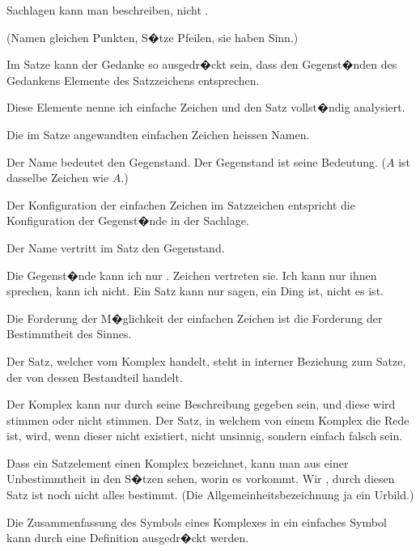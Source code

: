 \begin{propositions}
{Sachlagen kann man beschreiben, nicht .

(Namen gleichen Punkten, S�tze Pfeilen, sie
haben Sinn.)}


{Im Satze kann der Gedanke so ausgedr�ckt sein,
dass den Gegenst�nden des Gedankens Elemente
des Satzzeichens entsprechen.}


{Diese Elemente nenne ich \glqq{}einfache Zeichen\grqq{}
und den Satz \glqq{}vollst�ndig analysiert\grqq{}.}


{Die im Satze angewandten einfachen Zeichen
heissen Namen.}


{Der Name bedeutet den Gegenstand. Der
Gegenstand ist seine Bedeutung. (\glqq{}$A$\grqq{} ist dasselbe
Zeichen wie \glqq{}$A$\grqq{}.)}


{Der Konfiguration der einfachen Zeichen im
Satzzeichen entspricht die Konfiguration der Gegenst�nde
in der Sachlage.}


{Der Name vertritt im Satz den Gegenstand.}


{Die Gegenst�nde kann ich nur . Zeichen
vertreten sie. Ich kann nur  ihnen sprechen,
 kann ich nicht. Ein Satz
kann nur sagen,  ein Ding ist, nicht  es ist.}


{Die Forderung der M�glichkeit der einfachen
Zeichen ist die Forderung der Bestimmtheit des
Sinnes.}


{Der Satz, welcher vom Komplex handelt, steht
in interner Beziehung zum Satze, der von dessen
Bestandteil handelt.

Der Komplex kann nur durch seine Beschreibung
gegeben sein, und diese wird stimmen oder
nicht stimmen. Der Satz, in welchem von einem
Komplex die Rede ist, wird, wenn dieser nicht
existiert, nicht unsinnig, sondern einfach falsch sein.

Dass ein Satzelement einen Komplex bezeichnet,
kann man aus einer Unbestimmtheit in den S�tzen
sehen, worin es vorkommt. Wir , durch
diesen Satz ist noch nicht alles bestimmt. (Die
Allgemeinheitsbezeichnung  ja ein Urbild.)

Die Zusammenfassung des Symbols eines Komplexes
in ein einfaches Symbol kann durch eine
\enlargethispage{4pt} %
Definition ausgedr�ckt werden.}



\end{propositions}

